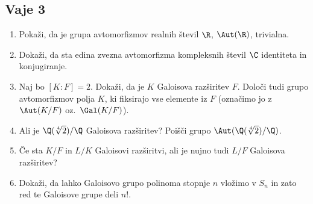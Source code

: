 \subsection*{Vaje 3}

\begin{enumerate}
    \item Pokaži, da je grupa avtomorfizmov realnih števil $\R$, $\Aut(\R)$, trivialna.
    \item Dokaži, da sta edina zvezna avtomorfizma kompleksnih števil $\C$ identiteta in konjugiranje.
    \item Naj bo $[K : F] = 2$. Dokaži, da je $K$ Galoisova razširitev $F$. 
    Določi tudi grupo avtomorfizmov polja $K$, ki fiksirajo vse elemente iz $F$ 
    (označimo jo z $\Aut(K/F)$ oz.~$\Gal(K/F)$).
    \item Ali je $\Q(\sqrt[4]{2})/\Q$ Galoisova razširitev? 
    Poišči grupo $\Aut(\Q(\sqrt[4]{2})/\Q)$.
    \item Če sta $K/F$ in $L/K$ Galoisovi razširitvi, ali je nujno tudi $L/F$ Galoisova razširitev?
    \item Dokaži, da lahko Galoisovo grupo polinoma stopnje $n$ vložimo v $S_n$ in 
    zato red te Galoisove grupe deli $n!$.
\end{enumerate}


%

%
